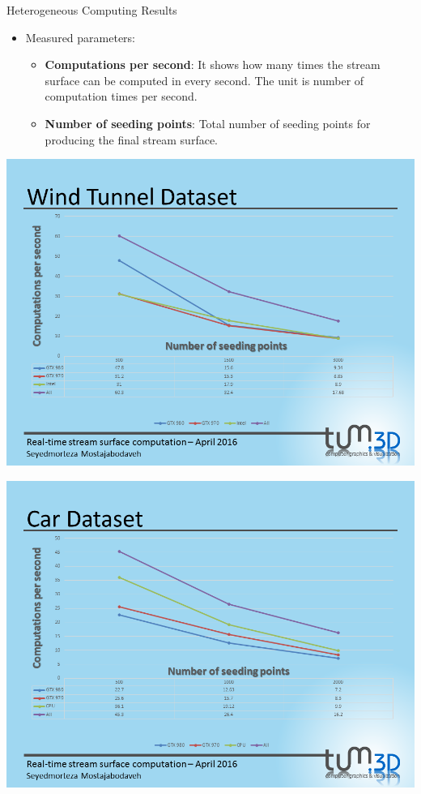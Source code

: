 \documentclass{beamer}
\begin{document}
\begin{frame}{Heterogeneous Computing Results}
	\begin{itemize}
		\item Measured parameters:
		\begin{itemize}
			\item \textbf{Computations per second}: It shows how many times the stream surface can be computed in every second. The unit is number of computation times per second.
			\item \textbf{Number of seeding points}: Total number of seeding points for producing the final stream surface.
		\end{itemize}
	\end{itemize}
\end{frame}

\begin{frame}{}
	\centering
	\includegraphics[height=\textheight]{figures/Slide19}
\end{frame}

\begin{frame}{}
	\centering
	\includegraphics[height=\textheight]{figures/Slide20}
\end{frame}
\end{document}
